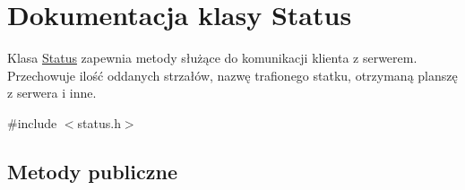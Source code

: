 \hypertarget{classStatus}{}\section{Dokumentacja klasy Status}
\label{classStatus}


Klasa \mbox{\hyperlink{classStatus}{Status}} zapewnia metody służące do komunikacji klienta z serwerem. Przechowuje ilość oddanych strzałów, nazwę trafionego statku, otrzymaną planszę z serwera i inne.  




{\ttfamily \#include $<$status.\+h$>$}

\subsection*{Metody publiczne}
